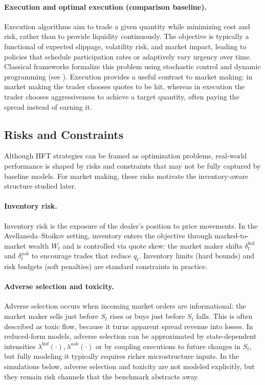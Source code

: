 \paragraph{Execution and optimal execution (comparison baseline).}
Execution algorithms aim to trade a given quantity while minimizing cost and risk, rather than to provide liquidity continuously. The objective is typically a functional of expected slippage, volatility risk, and market impact, leading to policies that schedule participation rates or adaptively vary urgency over time. Classical frameworks formalize this problem using stochastic control and dynamic programming (see \textcite{CarteaJaimungalPenalva2015}). Execution provides a useful contrast to market making: in market making the trader chooses quotes to be hit, whereas in execution the trader chooses aggressiveness to achieve a target quantity, often paying the spread instead of earning it.

\subsection{Risks and Constraints}
Although HFT strategies can be framed as optimization problems, real-world performance is shaped by risks and constraints that may not be fully captured by baseline models. For market making, these risks motivate the inventory-aware structure studied later.

\paragraph{Inventory risk.}
Inventory risk is the exposure of the dealer's position to price movements. In the Avellaneda--Stoikov setting, inventory enters the objective through marked-to-market wealth $W_t$ and is controlled via quote skew: the market maker shifts $\delta_t^{bid}$ and $\delta_t^{ask}$ to encourage trades that reduce $q_t$. Inventory limits (hard bounds) and risk budgets (soft penalties) are standard constraints in practice.

\paragraph{Adverse selection and toxicity.}
Adverse selection occurs when incoming market orders are informational: the market maker sells just before $S_t$ rises or buys just before $S_t$ falls. This is often described as toxic flow, because it turns apparent spread revenue into losses. In reduced-form models, adverse selection can be approximated by state-dependent intensities $\lambda^{bid}(\cdot),\lambda^{ask}(\cdot)$ or by coupling executions to future changes in $S_t$, but fully modeling it typically requires richer microstructure inputs. In the simulations below, adverse selection and toxicity are not modeled explicitly, but they remain risk channels that the benchmark abstracts away.

